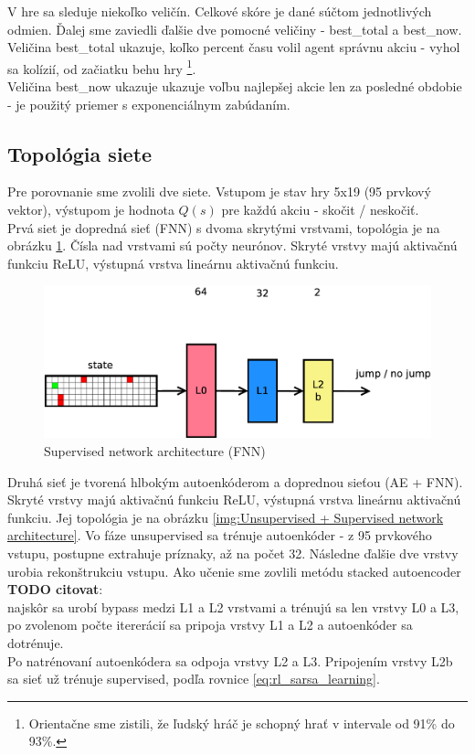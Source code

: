 \documentclass[10pt,a4paper]{article}
\begin{document}
V hre sa sleduje niekoľko veličín.
Celkové skóre je dané súčtom jednotlivých odmien. Ďalej sme zaviedli
ďalšie dve pomocné veličiny - best\_total a best\_now. \\
Veličina best\_total ukazuje, koľko percent času volil agent správnu akciu - vyhol sa kolízií,
od začiatku behu hry \footnote{Orientačne sme zistili, že ľudský hráč je schopný hrať v intervale od 91\% do 93\%.}. \\
Veličina best\_now ukazuje ukazuje voľbu najlepšej akcie len za posledné obdobie - je použitý
priemer s exponenciálnym zabúdaním.


\subsection{Topológia siete}

Pre porovnanie sme zvolili dve siete. Vstupom je stav hry 5x19 (95 prvkový vektor),
výstupom je hodnota $Q(s)$ pre každú akciu - skočit / neskočiť.
\\
Prvá siet je dopredná sieť (FNN) s dvoma skrytými vrstvami, topológia je na obrázku \ref{img:Supervised network architecture}.
Čísla nad vrstvami sú počty neurónov.
Skryté vrstvy majú aktivačnú funkciu ReLU, výstupná vrstva lineárnu aktivačnú funkciu.

\begin{figure}[!h]
  \centering
  \includegraphics[scale=0.4]{../../diagrams/fnn.png}
  \caption{Supervised network architecture (FNN)}
  \label{img:Supervised network architecture}
\end{figure}


Druhá sieť je tvorená hlbokým autoenkóderom a doprednou sieťou (AE + FNN).
Skryté vrstvy majú aktivačnú funkciu ReLU, výstupná vrstva lineárnu aktivačnú funkciu.
Jej topológia je na obrázku \ref{img:Unsupervised + Supervised network architecture}.
Vo fáze unsupervised sa trénuje autoenkóder - z 95 prvkového vstupu, postupne extrahuje
príznaky, až na počet 32. Následne ďalšie dve vrstvy urobia rekonštrukciu vstupu.
Ako učenie sme zovlili metódu stacked autoencoder {\bf TODO citovat}: \\
najskôr sa urobí bypass medzi L1 a L2 vrstvami a trénujú sa len vrstvy L0 a L3,
po zvolenom počte itererácií sa pripoja vrstvy L1 a L2 a autoenkóder sa dotrénuje.
\\
Po natrénovaní autoenkódera sa odpoja vrstvy L2 a L3. Pripojením vrstvy L2b sa sieť
už trénuje supervised, podľa rovnice \ref{eq:rl_sarsa_learning}.
\end{document}
